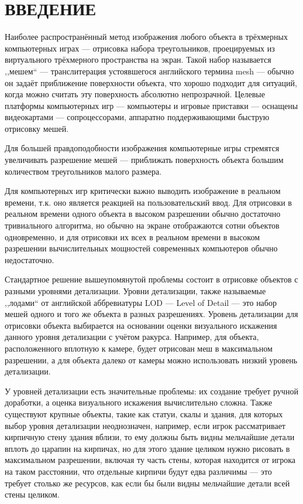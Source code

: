 \clearpage
\section{ВВЕДЕНИЕ}
Наиболее распространённый метод изображения любого объекта в трёхмерных компьютерных играх --- отрисовка набора треугольников, проецируемых из виртуального трёхмерного пространства на экран.
Такой набор называется ,,мешем`` --- транслитерация устоявшегося английского термина mesh --- обычно он задаёт приближение поверхности объекта, что хорошо подходит для ситуаций, когда можно считать эту поверхность абсолютно непрозрачной.
Целевые платформы компьютерных игр --- компьютеры и игровые приставки --- оснащены видеокартами --- сопроцессорами, аппаратно поддерживающими быструю отрисовку мешей.

Для большей правдоподобности изображения компьютерные игры стремятся увеличивать разрешение мешей --- приближать поверхность объекта большим количеством треугольников малого размера.

Для компьютерных игр критически важно выводить изображение в реальном времени, т.к. оно является реакцией на пользовательский ввод.
Для отрисовки в реальном времени одного объекта в высоком разрешении обычно достаточно тривиального алгоритма, но обычно на экране отображаются сотни объектов одновременно, и для отрисовки их всех в реальном времени в высоком разрешении вычислительных мощностей современных компьютеров обычно недостаточно.

Стандартное решение вышеупомянутой проблемы состоит в отрисовке объектов с разными уровнями детализации.
Уровни детализации, также называемые ,,лодами`` от английской аббревиатуры LOD --- Level of Detail --- это набор мешей одного и того же объекта в разных разрешениях.
Уровень детализации для отрисовки объекта выбирается на основании оценки визуального искажения данного уровня детализации с учётом ракурса.
Например, для объекта, расположенного вплотную к камере, будет отрисован меш в максимальном разрешении, а для объекта далеко от камеры можно использовать низкий уровень детализации.

У уровней детализации есть значительные проблемы: их создание требует ручной доработки, а оценка визуального искажения вычислительно сложна.
Также существуют крупные объекты, такие как статуи, скалы и здания, для которых выбор уровня детализации неоднозначен, например, если игрок рассматривает кирпичную стену здания вблизи, то ему должны быть видны мельчайшие детали вплоть до царапин на кирпичах, но для этого здание целиком нужно рисовать в максимальном разрешении, включая ту часть стены, которая находится от игрока на таком расстоянии, что отдельные кирпичи будут едва различимы --- это требует столько же ресурсов, как если бы были видны мельчайшие детали всей стены целиком.

